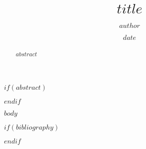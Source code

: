 \documentclass[11pt,a4paper]{article}
\title{$title$}
\author{$author$}
\date{$date$}
\begin{document}
\maketitle

$if(abstract)$
\begin{abstract}
$abstract$
\end{abstract}
$endif$

$body$

$if(bibliography)$


$endif$
\end{document}
